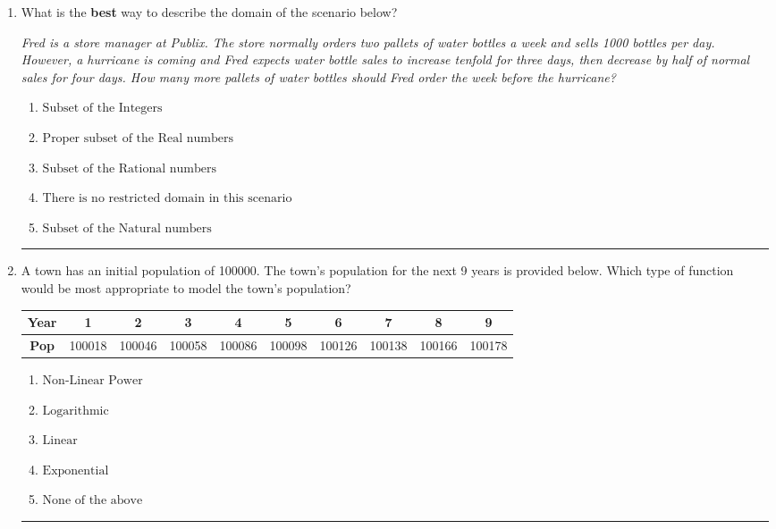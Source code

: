 \documentclass[14pt]{extbook}
\newcommand{\litem}[1]{\item#1\hspace*{-1cm}\rule{\textwidth}{0.4pt}}
\begin{document}
\begin{enumerate}
\litem{
What is the \textbf{best} way to describe the domain of the scenario below?
\begin{center}
    \textit{ Fred is a store manager at Publix. The store normally orders two pallets of water bottles a week and sells 1000 bottles per day. However, a hurricane is coming and Fred expects water bottle sales to increase tenfold for three days, then decrease by half of normal sales for four days. How many more pallets of water bottles should Fred order the week before the hurricane? }
\end{center}
\begin{enumerate}[label=\Alph*.]
\item \( \text{Subset of the Integers} \)
\item \( \text{Proper subset of the Real numbers} \)
\item \( \text{Subset of the Rational numbers} \)
\item \( \text{There is no restricted domain in this scenario} \)
\item \( \text{Subset of the Natural numbers} \)

\end{enumerate} }
\litem{
A town has an initial population of 100000. The town's population for the next 9 years is provided below. Which type of function would be most appropriate to model the town's population?

\begin{tabular}{c|c|c|c|c|c|c|c|c|c}
\textbf{Year} &1 &2 &3 &4 &5 &6 &7 &8 &9\tabularnewline \hline
\textbf{Pop} &100018 &100046 &100058 &100086 &100098 &100126 &100138 &100166 &100178\end{tabular}\begin{enumerate}[label=\Alph*.]
\item \( \text{Non-Linear Power} \)
\item \( \text{Logarithmic} \)
\item \( \text{Linear} \)
\item \( \text{Exponential} \)
\item \( \text{None of the above} \)


\end{enumerate}}
\end{enumerate}
\end{document}
